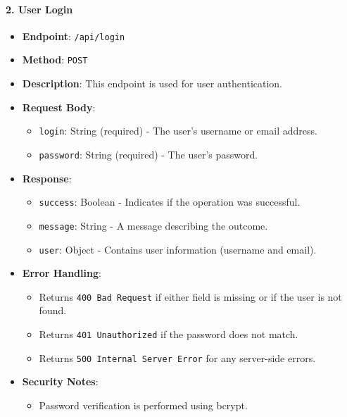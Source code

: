 \hypertarget{user-login}{%
\paragraph{2. User Login}\label{user-login}}

\begin{itemize}
\tightlist
\item
  \textbf{Endpoint}: \texttt{/api/login}
\item
  \textbf{Method}: \texttt{POST}
\item
  \textbf{Description}: This endpoint is used for user authentication.
\item
  \textbf{Request Body}:

  \begin{itemize}
  \tightlist
  \item
    \texttt{login}: String (required) - The user's username or email
    address.
  \item
    \texttt{password}: String (required) - The user's password.
  \end{itemize}
\item
  \textbf{Response}:

  \begin{itemize}
  \tightlist
  \item
    \texttt{success}: Boolean - Indicates if the operation was
    successful.
  \item
    \texttt{message}: String - A message describing the outcome.
  \item
    \texttt{user}: Object - Contains user information (username and
    email).
  \end{itemize}
\item
  \textbf{Error Handling}:

  \begin{itemize}
  \tightlist
  \item
    Returns \texttt{400\ Bad\ Request} if either field is missing or if
    the user is not found.
  \item
    Returns \texttt{401\ Unauthorized} if the password does not match.
  \item
    Returns \texttt{500\ Internal\ Server\ Error} for any server-side
    errors.
  \end{itemize}
\item
  \textbf{Security Notes}:

  \begin{itemize}
  \tightlist
  \item
    Password verification is performed using bcrypt.
  \end{itemize}
\end{itemize}

